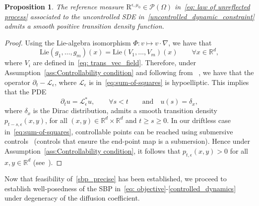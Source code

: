 \documentclass{amsart}
\newtheorem{proposition}[theorem]{Proposition}
\numberwithin{equation}{section}
\newcommand{\R}{\mathbb{R}}
\begin{document}
\begin{proposition}\label{lem:kernel}
The reference measure $\mathrm{R}^{\epsilon,\mu_0}\in\mathcal P(\Omega)$ in~\eqref{eq: law of unreflected process} associated to the uncontrolled SDE in~\eqref{uncontrolled_dynamic_constraint} 
admits a smooth positive transition density function. 
\end{proposition}
\begin{proof}
Using the Lie-algebra isomorphism $\Phi:v\mapsto v\cdot\nabla$, we have that
\[
\mathrm{Lie}(g_1,\dots,g_m)(x)= \mathrm{Lie}(V_1,\dots,V_m)(x)
\qquad \forall x\in\mathbb{R}^d,
\]
where $V_i$ are defined in~\eqref{eq: trans_vec_field}. Therefore, under Assumption~\eqref{ass:Controllability condition} and following from~\cite[Theorem~1.1]{Hormander1967} , we have that the operator $\partial_t-\mathcal L_{\epsilon}$, where $\mathcal L_{\epsilon}$ is in~\eqref{eq:sum-of-squares} is hypoelliptic. This implies that the PDE
\[
\partial_tu=\mathcal L_{\epsilon}^*u,\qquad  \forall s<t\qquad\text{and}\quad u(s)=\delta_{x},
\]
where $\delta_{x}$ is the Dirac distribution, admits a smooth transition density $p_{t-s,\epsilon}(x,y)$, for all $(x,y)\in\mathbb{R}^d\times\mathbb{R}^d$ and $t\geq s\geq 0$.   In our driftless case in~\eqref{eq:sum-of-squares}, controllable points can be reached using submersive controls~\cite[pp.~397]{arous1991decroissance} (controls that ensure the end-point map is a submersion). Hence under Assumption~\ref{ass:Controllability condition}, it follows that $p_{t,\epsilon}(x,y) > 0$ for all $x,y\in\R^d$ (see~\cite[Main Theorem]{leandre2005positivity}). 
\end{proof} 
Now that feasibility of~\eqref{sbp_precise} has been established, we proceed  to establish well-posedness of the SBP in~\eqref{eq: objective}-\eqref{controlled_dynamics} under degeneracy of the diffusion coefficient. 
\end{document}

